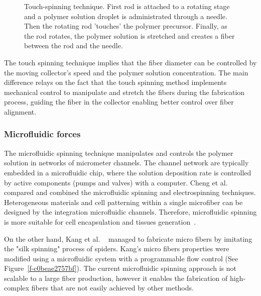 \documentclass[5p,,preprint,12pt,twocolumn]{elsarticle}
\makeatletter
\def\fixFloatSize#1{}%
\makeatother
\begin{document}
\bgroup
\fixFloatSize{images/c33e7bfe-18c6-4765-834e-a85f12cd2621-uimg_touch_process.png}
\begin{figure}[!htbp]
\centering \makeatletter{}
\makeatother 
\caption{{Touch-spinning technique. First rod is attached to a rotating stage and a polymer solution droplet is administrated through a needle. Then the rotating rod 'touches' the polymer precursor. Finally, as the rod rotates, the polymer solution is stretched and creates a fiber between the rod and the needle.}}
\label{f-f17259e76303}
\end{figure}
\egroup
The touch spinning technique implies that the fiber diameter can be controlled by the moving collector's speed and the polymer solution concentration. The main difference relays on the fact that the touch spinning method implements mechanical control to manipulate and stretch the fibers during the fabrication process, guiding the fiber in the collector enabling better control over fiber alignment.\unskip~\cite{527120:14091959}



\subsubsection{Microfluidic forces}The microfluidic spinning technique manipulates and controls the polymer solution in networks of micrometer channels. The channel network are typically embedded in a microfluidic chip, where the solution deposition rate is controlled by active components (pumps and valves) with a computer. Cheng et al. \unskip~\cite{527120:13656236} compared and combined the microfluidic spinning and electrospinning techniques. Heterogeneous materials and cell patterning within a single microfiber can be designed by the integration microfluidic channels. Therefore, microfluidic spinning is more suitable for cell encapsulation and tissues generation\unskip~\cite{527120:13656236}.

On the other hand, Kang et al. \unskip~\cite{527120:13656548} managed to fabricate micro fibers by imitating the "silk spinning" process of spiders. Kang's micro fibers properties were modified using a microfluidic system with a programmable flow control (See Figure~\ref{f-c0beae2757bf}). The current microfluidic spinning approach is not scalable to a large fiber production, however it enables the fabrication of high-complex fibers that are not easily achieved by other methods.
\end{document}
